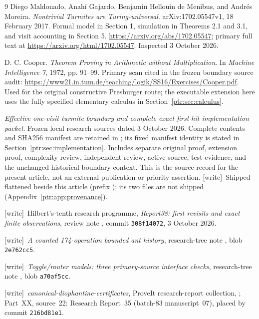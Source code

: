 \documentclass[11pt,letterpaper]{article}
\theoremstyle{definition}\newtheorem{definition}[theorem]{Definition}
\theoremstyle{remark}\newtheorem{remark}[theorem]{Remark}
\newcommand{\code}[1]{\texttt{\detokenize{#1}}}
\newcommand{\wtag}{\textup{[write]}}
\begin{document}
\begin{thebibliography}{9}
Diego Maldonado, Anah\'{i} Gajardo, Benjamin Hellouin de Menibus, and Andr\'{e}s Moreira.
\emph{Nontrivial Turmites are Turing-universal}. arXiv:1702.05547v1, 18 February 2017.
Formal model in Section 1, simulation in Theorems 2.1 and 3.1, and visit accounting in Section 5.
\url{https://arxiv.org/abs/1702.05547}; primary full text at
\url{https://arxiv.org/html/1702.05547}. Inspected 3 October 2026.

D. C. Cooper. \emph{Theorem Proving in Arithmetic without Multiplication}.
In \emph{Machine Intelligence 7}, 1972, pp. 91--99.
Primary scan cited in the frozen boundary source audit:
\url{https://www21.in.tum.de/teaching/logik/SS16/Exercises/Cooper.pdf}.
Used for the original constructive Presburger route; the executable extension here uses the fully specified elementary calculus in Section~\ref{ptr:sec:calculus}.

\emph{Effective one-visit turmite boundary and complete exact first-hit implementation packet}.
Frozen local research sources dated 3 October 2026. Complete contents and SHA256 manifest are retained in \code{evidence/source-packet/}; its fixed manifest identity is stated in Section~\ref{ptr:sec:implementation}. Includes separate original proof, extension proof, complexity review, independent review, active source, test evidence, and the unchanged historical boundary context. This is the source record for the present article, not an external publication or priority assertion.
\wtag\ Shipped flattened beside this article (prefix );
its two  files are not shipped
(Appendix~\ref{ptr:app:provenance}).

\wtag\ Hilbert's-tenth research programme, \emph{Report38: first revisits and
exact finite observations}, review note
,
commit \texttt{308f14072}, 3 October 2026.

\wtag\ \emph{A counted 174-operation bounded ant history}, research-tree note
,
blob \texttt{2e762cc5}.

\wtag\ \emph{Toggle/router models: three primary-source interface checks},
research-tree note
,
blob \texttt{a70af5cc}.

\wtag\ \emph{canonical-diophantine-certificates}, ProveIt research-report
collection,
;
Part~XX, source~22: Research Report~35 (batch-83 manuscript~07), placed by
commit \texttt{216bd81e1}.
\end{thebibliography}
\clearpage
\end{document}
